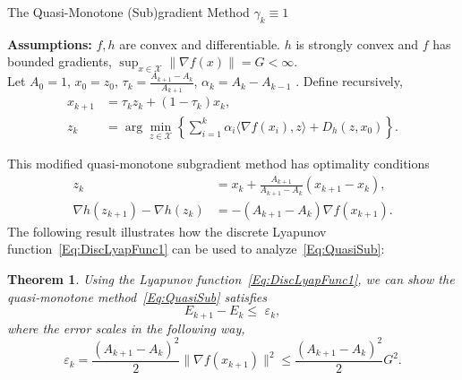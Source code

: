 \documentclass[11pt]{article}
\theoremstyle{plain}
\newtheorem{theorem}{Theorem}
\newcommand{\X}{{\mathcal X}}
\begin{document}
\begin{algorithm}[H]
\caption{The Quasi-Monotone (Sub)gradient Method $\gamma_k \equiv 1$}
{\bf Assumptions:} $f, h$ are convex and differentiable. $h$ is strongly convex and $f$ has bounded gradients, $\sup_{x\in\X}\|\nabla f(x)\| = G <\infty$. \\
Let $A_0 = 1$, $x_0 = z_0$, $\tau_k = \frac{A_{k+1} - A_k}{A_{k+1}}$, $\alpha_k = A_{k} - A_{k-1}$ . Define recursively,
\begin{subequations}\label{Eq:QuasiSub1}
\begin{align}
x_{k+1} &= \tau_k z_k + (1 - \tau_k)x_{k} ,\label{Eq:ZSeqQuasi1}\\
z_k &= \arg \min_{z\in \X} \left\{ \sum_{i=1}^k \alpha_i \langle \nabla f(x_i), z\rangle + D_h(z, x_0)\right\} \label{Eq:XSeqQuasi1}.
\end{align} 
\end{subequations}
\end{algorithm}
\noindent This modified quasi-monotone subgradient method has optimality conditions
\begin{subequations}\label{Eq:QuasiSub}
\begin{align}
z_{k} &= x_{k} + \frac{A_{k+1}}{A_{k+1} -A_{k}} (x_{k+1} - x_k),\label{Eq:ZSeqQuasi}\\
\nabla h(z_{k+1}) -\nabla h(z_k) &= -(A_{k+1} - A_{k})\nabla f(x_{k+1})\label{Eq:XSeqQuasi}.
\end{align} 
\end{subequations}
The following result illustrates how the discrete Lyapunov function~\eqref{Eq:DiscLyapFunc1} can be used to analyze~\eqref{Eq:QuasiSub}:
\begin{theorem}
\label{Thm:Quasi}
Using the Lyapunov function~\eqref{Eq:DiscLyapFunc1},
we can show the quasi-monotone method~\eqref{Eq:QuasiSub} satisfies \[E_{k+1} - E_k \leq \,\,\varepsilon_k,\] where the error scales in the following way,%
\[\varepsilon_k = \frac{(A_{k+1}- A_k)^2}{2}\|\nabla f(x_{k+1})\|^2 \leq \frac{(A_{k+1}- A_k)^2}{2}G^2.\]
\end{theorem}
\end{document}
